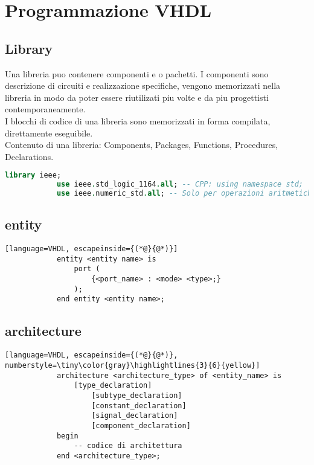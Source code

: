 \section{Programmazione VHDL}
    \subsection{Library}
        Una libreria puo contenere componenti e o pachetti. I componenti sono descrizione di circuiti e realizzazione specifiche,
        vengono memorizzati nella libreria in modo da poter essere riutilizati piu volte e da piu progettisti contemporaneamente.\\
        I blocchi di codice di una libreria sono memorizzati in forma compilata, direttamente eseguibile.\\
        Contenuto di una libreria: Components, Packages, Functions, Procedures, Declarations.
        \begin{lstlisting}[language=VHDL]
            library ieee; 
            use ieee.std_logic_1164.all; -- CPP: using namespace std;
            use ieee.numeric_std.all; -- Solo per operazioni aritmetiche per vettori
        \end{lstlisting}


    \subsection{entity}
        \begin{lstlisting}[language=VHDL, escapeinside={(*@}{@*)}]
            entity <entity name> is
                port (
                    {<port_name> : <mode> <type>;}
                );
            end entity <entity name>;
        \end{lstlisting}

    \subsection{architecture}
        \begin{lstlisting}[language=VHDL, escapeinside={(*@}{@*)}, numberstyle=\tiny\color{gray}\highlightlines{3}{6}{yellow}]
            architecture <architecture_type> of <entity_name> is
                [type_declaration]
                    [subtype_declaration]
                    [constant_declaration]
                    [signal_declaration]
                    [component_declaration]
            begin
                -- codice di architettura
            end <architecture_type>;
        \end{lstlisting}


